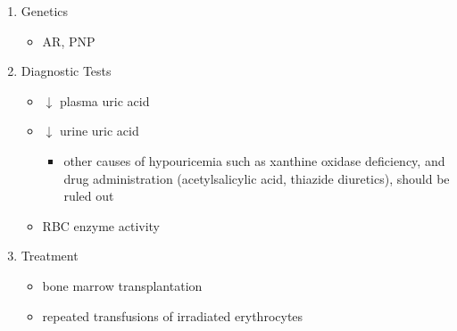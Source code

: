 \documentclass{scrartcl}
\begin{document}
\begin{enumerate}
\item Genetics
\label{sec:orgb773b99}
\begin{itemize}
\item AR, PNP
\end{itemize}

\item Diagnostic Tests
\label{sec:org76beaf0}
\begin{itemize}
\item \(\downarrow\) plasma uric acid
\item \(\downarrow\) urine uric acid
\begin{itemize}
\item other causes of hypouricemia such as xanthine oxidase deficiency,
and drug administration (acetylsalicylic acid, thiazide diuretics),
should be ruled out
\end{itemize}
\item RBC enzyme activity
\end{itemize}

\item Treatment
\label{sec:orgf17d7df}
\begin{itemize}
\item bone marrow transplantation
\item repeated transfusions of irradiated erythrocytes
\end{itemize}
\end{enumerate}
\end{document}
